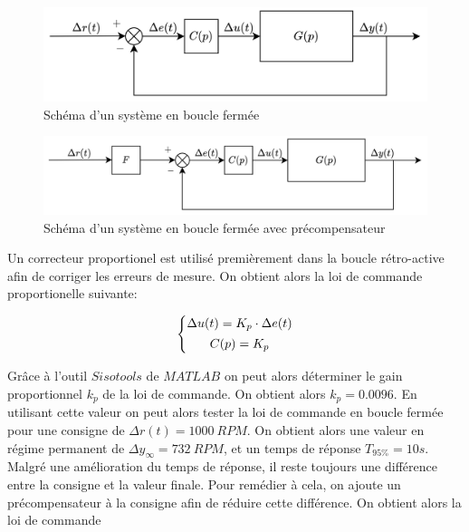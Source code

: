 \documentclass[12pt]{report}
\begin{document}
\begin{figure}[h]
  \centering
  \vspace{0.3cm}
  \includegraphics[scale=0.25]{fig/closed_loop_system.png}
  \caption{Schéma d'un système en boucle fermée}
\end{figure}

\begin{figure}[h]
  \centering
  \vspace{0.3cm}
  \includegraphics[scale=0.25]{fig/closed_loop_system_w-precomp.png}
  \caption{Schéma d'un système en boucle fermée avec précompensateur}
\end{figure}

Un correcteur proportionel est utilisé premièrement dans la boucle rétro-active
afin de corriger les erreurs de mesure. On obtient alors la loi de commande proportionelle suivante:

\vspace{0.1cm}
\begin{equation}
  \left\{
  \begin{matrix}
    \Delta u(t) = K_p \cdot \Delta e(t) \vspace{1ex} \\
    C(p) = K_p
  \end{matrix}
  \right.
\end{equation}
\vspace{0.1cm}

Grâce à l'outil $Sisotools$ de $MATLAB$ on peut alors déterminer le gain
proportionnel $k_p$ de la loi de commande. On obtient alors $k_p = 0.0096$.
En utilisant cette valeur on peut alors tester la loi de commande en boucle fermée
pour une consigne de $\Delta r(t) = 1000 ~ RPM$. On obtient alors une valeur en régime
permanent de $\Delta y_{\infty} = 732 ~ RPM$, et un temps de réponse $T_{95\%} = 10s$.
Malgré une amélioration du temps de réponse, il reste toujours une différence entre
la consigne et la valeur finale. Pour remédier à cela, on ajoute un précompensateur
à la consigne afin de réduire cette différence. On obtient alors la loi de commande
\end{document}
